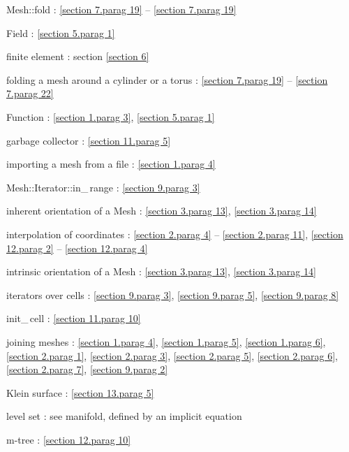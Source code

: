 \documentclass[a4paper]{scrreprt}
\def\numb{}
\newcommand\verm[1]{\textcolor{manif}{#1}}
\renewcommand\tt{\normalfont\ttfamily}
\begin{document}
\noindent
{\small\tt\verm{Mesh}::fold} :
\ref{\numb section 7.\numb parag 19} -- \ref{\numb section 7.\numb parag 19}

\noindent
{\small\tt \verm{Field}} : \ref{\numb section 5.\numb parag 1}

\noindent
finite element : section \ref{\numb section 6}

\noindent
folding a mesh around a cylinder or a torus : \ref{\numb section 7.\numb parag 19} --
\ref{\numb section 7.\numb parag 22}

\noindent
{\small\tt \verm{Function}} : \ref{\numb section 1.\numb parag 3},
\ref{\numb section 5.\numb parag 1}

\noindent
garbage collector : \ref{\numb section 11.\numb parag 5}

\noindent
importing a mesh from a file : \ref{\numb section 1.\numb parag 4}

\noindent
{\small\tt\verm{Mesh}::Iterator::in\_\,range} : \ref{\numb section 9.\numb parag 3}

\noindent
inherent orientation of a {\small\tt\verm{Mesh}} : \ref{\numb section 3.\numb parag 13},
\ref{\numb section 3.\numb parag 14}

\noindent
interpolation of coordinates :
\ref{\numb section 2.\numb parag 4} -- \ref{\numb section 2.\numb parag 11},
\ref{\numb section 12.\numb parag 2} -- \ref{\numb section 12.\numb parag 4}

\noindent
intrinsic orientation of a {\small\tt\verm{Mesh}} : \ref{\numb section 3.\numb parag 13},
\ref{\numb section 3.\numb parag 14}

\noindent
iterators over cells : \ref{\numb section 9.\numb parag 3}, \ref{\numb section 9.\numb parag 5},
\ref{\numb section 9.\numb parag 8}

\noindent
{\small\tt init\_\,cell} : \ref{\numb section 11.\numb parag 10}

\noindent
{\small\tt join}ing meshes : \ref{\numb section 1.\numb parag 4},
\ref{\numb section 1.\numb parag 5}, \ref{\numb section 1.\numb parag 6},
\ref{\numb section 2.\numb parag 1}, \ref{\numb section 2.\numb parag 3},
\ref{\numb section 2.\numb parag 5}, \ref{\numb section 2.\numb parag 6},
\ref{\numb section 2.\numb parag 7}, \ref{\numb section 9.\numb parag 2}

\noindent
Klein surface : \ref{\numb section 13.\numb parag 5}

\noindent
level set : see manifold, defined by an implicit equation

\noindent
m-tree : \ref{\numb section 12.\numb parag 10}
\end{document}
